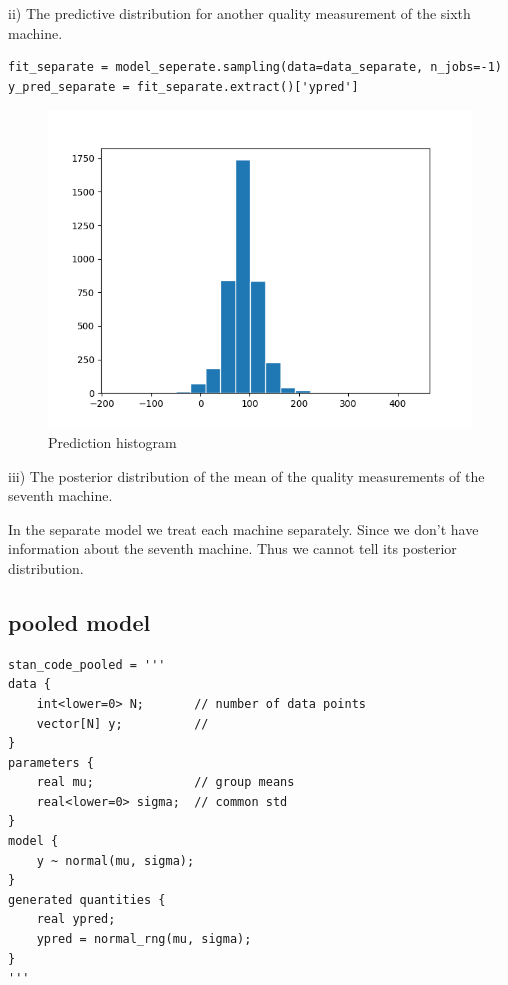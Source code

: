 \documentclass{article}
\begin{document}
ii) The predictive distribution for another quality measurement of the sixth machine.

\begin{verbatim}
fit_separate = model_seperate.sampling(data=data_separate, n_jobs=-1)
y_pred_separate = fit_separate.extract()['ypred']  
\end{verbatim}


\begin{figure}[H]
\centering  
\includegraphics[scale=0.5]{separate_hist.png}
\caption{Prediction histogram}
\label{fig: label}
\end{figure}

iii) The posterior distribution of the mean of the quality measurements of the seventh machine.

In the separate model we treat each machine separately. Since we don't have information about the seventh machine. Thus we cannot tell its posterior distribution.

\subsection{pooled model}

\begin{verbatim}  
stan_code_pooled = '''
data {
    int<lower=0> N;       // number of data points
    vector[N] y;          //
}
parameters {
    real mu;              // group means
    real<lower=0> sigma;  // common std
}
model {
    y ~ normal(mu, sigma);
}
generated quantities {
    real ypred;
    ypred = normal_rng(mu, sigma);
}
'''
\end{verbatim}
\end{document}
